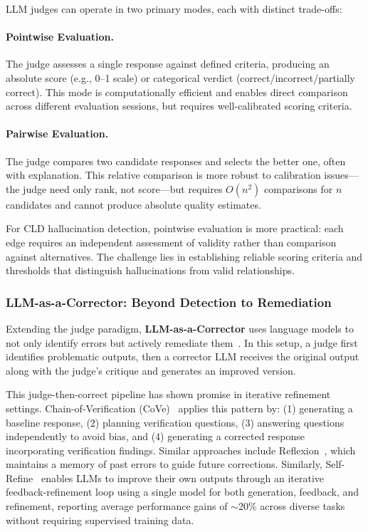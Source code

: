 LLM judges can operate in two primary modes, each with distinct trade-offs:

\paragraph{Pointwise Evaluation.} The judge assesses a single response against defined criteria, producing an absolute score (e.g., 0--1 scale) or categorical verdict (correct/incorrect/partially correct). This mode is computationally efficient and enables direct comparison across different evaluation sessions, but requires well-calibrated scoring criteria.

\paragraph{Pairwise Evaluation.} The judge compares two candidate responses and selects the better one, often with explanation. This relative comparison is more robust to calibration issues---the judge need only rank, not score---but requires $O(n^2)$ comparisons for $n$ candidates and cannot produce absolute quality estimates.

For CLD hallucination detection, pointwise evaluation is more practical: each edge requires an independent assessment of validity rather than comparison against alternatives. The challenge lies in establishing reliable scoring criteria and thresholds that distinguish hallucinations from valid relationships.

\subsubsection{LLM-as-a-Corrector: Beyond Detection to Remediation}

Extending the judge paradigm, \textbf{LLM-as-a-Corrector} uses language models to not only identify errors but actively remediate them~\citep{shinn2024reflexion, dhuliawala2024chain}. In this setup, a judge first identifies problematic outputs, then a corrector LLM receives the original output along with the judge's critique and generates an improved version.

This judge-then-correct pipeline has shown promise in iterative refinement settings. Chain-of-Verification (CoVe)~\citep{dhuliawala2024chain} applies this pattern by: (1) generating a baseline response, (2) planning verification questions, (3) answering questions independently to avoid bias, and (4) generating a corrected response incorporating verification findings. Similar approaches include Reflexion~\citep{shinn2024reflexion}, which maintains a memory of past errors to guide future corrections. Similarly, Self-Refine~\citep{madaan2023selfrefineiterativerefinementselffeedback} enables LLMs to improve their own outputs through an iterative feedback-refinement loop using a single model for both generation, feedback, and refinement, reporting average performance gains of $\sim$20\% across diverse tasks without requiring supervised training data.

